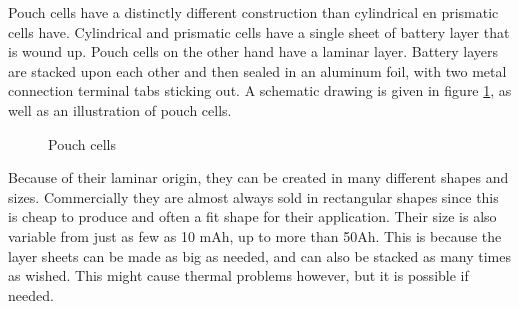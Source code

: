 \begin{enumerate}
Pouch cells have a distinctly different construction than cylindrical en prismatic cells have. Cylindrical and prismatic cells have a single sheet of battery layer that is wound up. Pouch cells on the other hand have a laminar layer. Battery layers are stacked upon each other and then sealed in an aluminum foil, with two metal connection terminal tabs sticking out. A schematic drawing is given in figure \ref{Fig:lipo_cell}, as well as an illustration of pouch cells.
\begin{figure}[H]
  \centering
  \hfill
  \caption{Pouch cells}
  \label{Fig:lipo_cell}
\end{figure}
Because of their laminar origin, they can be created in many different shapes and sizes. Commercially they are almost always sold in rectangular shapes since this is cheap to produce and often a fit shape for their application. Their size is also variable from just as few as 10 mAh, up to more than 50Ah. This is because the layer sheets can be made as big as needed, and can also be stacked as many times as wished. This might cause thermal problems however, but it is possible if needed.\\

\end{enumerate}
